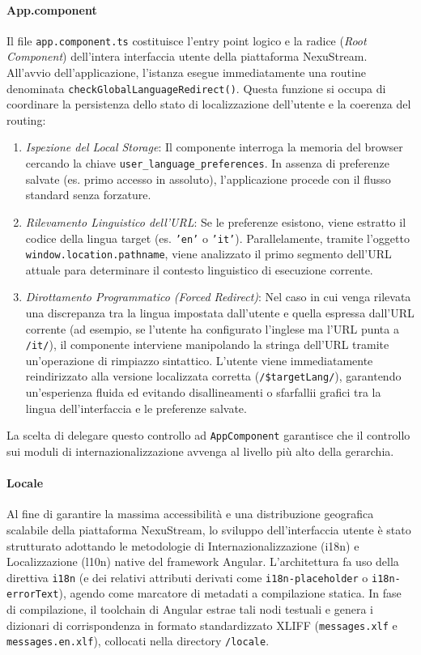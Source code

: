\documentclass[11pt,a4paper]{article}
\begin{document}
\paragraph{App.component}
Il file \texttt{app.component.ts} costituisce l'entry point logico e la radice (\textit{Root Component}) dell'intera interfaccia utente della piattaforma NexuStream. All'avvio dell'applicazione, l'istanza esegue immediatamente una routine denominata \texttt{checkGlobalLanguageRedirect()}. Questa funzione si occupa di coordinare la persistenza dello stato di localizzazione dell'utente e la coerenza del routing:
\begin{enumerate}
    \item \textit{Ispezione del Local Storage}: Il componente interroga la memoria del browser cercando la chiave \texttt{user\_language\_preferences}. In assenza di preferenze salvate (es. primo accesso in assoluto), l'applicazione procede con il flusso standard senza forzature.
    \item \textit{Rilevamento Linguistico dell'URL}: Se le preferenze esistono, viene estratto il codice della lingua target (es. \texttt{'en'} o \texttt{'it'}). Parallelamente, tramite l'oggetto \texttt{window.location.pathname}, viene analizzato il primo segmento dell'URL attuale para determinare il contesto linguistico di esecuzione corrente.
    \item \textit{Dirottamento Programmatico (Forced Redirect)}: Nel caso in cui venga rilevata una discrepanza tra la lingua impostata dall'utente e quella espressa dall'URL corrente (ad esempio, se l'utente ha configurato l'inglese ma l'URL punta a \texttt{/it/}), il componente interviene manipolando la stringa dell'URL tramite un'operazione di rimpiazzo sintattico. L'utente viene immediatamente reindirizzato alla versione localizzata corretta (\texttt{/\${targetLang}/}), garantendo un'esperienza fluida ed evitando disallineamenti o sfarfallii grafici tra la lingua dell'interfaccia e le preferenze salvate.
\end{enumerate}
La scelta di delegare questo controllo ad \texttt{AppComponent} garantisce che il controllo sui moduli di internazionalizzazione avvenga al livello più alto della gerarchia. 

\paragraph{Locale}
Al fine di garantire la massima accessibilità e una distribuzione geografica scalabile della piattaforma NexuStream, lo sviluppo dell'interfaccia utente è stato strutturato adottando le metodologie di Internazionalizzazione (i18n) e Localizzazione (l10n) native del framework Angular. L’architettura fa uso della direttiva \texttt{i18n} (e dei relativi attributi derivati come \texttt{i18n-placeholder} o \texttt{i18n-errorText}), agendo come marcatore di metadati a compilazione statica. In fase di compilazione, il toolchain di Angular estrae tali nodi testuali e genera i dizionari di corrispondenza in formato standardizzato XLIFF (\texttt{messages.xlf} e \texttt{messages.en.xlf}), collocati nella directory \texttt{/locale}.
\end{document}
